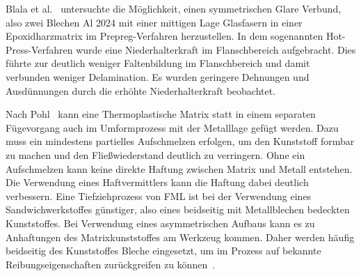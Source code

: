 Blala et al.~\cite{Blala2021} untersuchte die Möglichkeit, einen symmetrischen Glare Verbund, also zwei Blechen Al 2024 mit einer mittigen Lage Glasfasern in einer Epoxidharzmatrix im Prepreg-Verfahren herzustellen.
In dem sogenannten Hot-Press-Verfahren wurde eine Niederhalterkraft im Flanschbereich aufgebracht.
Dies führte zur deutlich weniger Faltenbildung im Flanschbereich und damit verbunden weniger Delamination.
Es wurden geringere Dehnungen und Ausdünnungen durch die erhöhte Niederhalterkraft beobachtet.

Nach Pohl~\cite{Pohl2000} kann eine Thermoplastische Matrix statt in einem separaten Fügevorgang auch im Umformprozess mit der Metalllage gefügt werden.
Dazu muss ein mindestens partielles Aufschmelzen erfolgen, um den Kunststoff formbar zu machen und den Fließwiederstand deutlich zu verringern.
Ohne ein Aufschmelzen kann keine direkte Haftung zwischen Matrix und Metall entstehen.
Die Verwendung eines Haftvermittlers kann die Haftung dabei deutlich verbessern.
Eine Tiefziehprozess von FML ist bei der Verwendung eines Sandwichwerkstoffes günstiger, also eines beidseitig mit Metallblechen bedeckten Kunststoffes.
Bei Verwendung eines asymmetrischen Aufbaus kann es zu Anhaftungen des Matrixkunststoffes am Werkzeug kommen.
Daher werden häufig beidseitig des Kunststoffes Bleche eingesetzt, um im Prozess auf bekannte Reibungseigenschaften zurückgreifen zu können~\cite{Behrens2014}.



